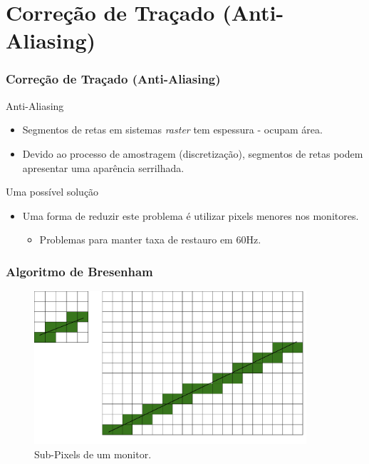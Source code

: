 \documentclass{beamer}
\begin{document}
\section{Correção de Traçado (Anti-Aliasing)}
\begin{frame}
\frametitle{Correção de Traçado (Anti-Aliasing)}
	\begin{block}{Anti-Aliasing}
		\begin{itemize}
			\item Segmentos de retas em sistemas \textit{raster} tem espessura - ocupam área.
			\item Devido ao processo de amostragem (discretização), segmentos de retas podem apresentar uma aparência serrilhada.
		\end{itemize}
	\end{block}
	
	\begin{block}{Uma possível solução}
		\begin{itemize}
			\item Uma forma de reduzir este problema é utilizar pixels menores nos monitores.
			\begin{itemize}
				\item Problemas para manter taxa de restauro em 60Hz.
			\end{itemize}
		\end{itemize}
	\end{block}

\end{frame}

\begin{frame}
\frametitle{Algoritmo de Bresenham}
	\begin{figure}[!h]
			\begin{center}
				\includegraphics[width=0.9\textwidth]{Figures/AntAliSub}
				\caption{Sub-Pixels de um monitor.}
			\end{center}
		\end{figure}
\end{frame}
\end{document}
